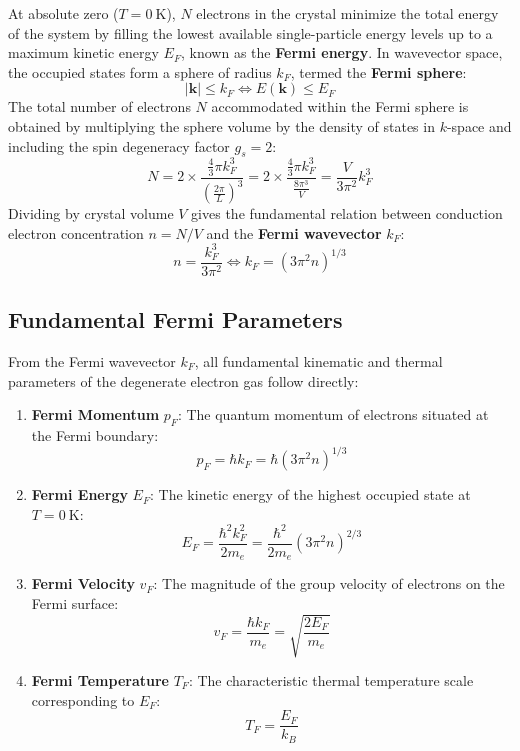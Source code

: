 \documentclass[11pt,a4paper]{article}
\newcommand{\vb}[1]{\mathbf{#1}}
\begin{document}
At absolute zero ($T = 0\ \mathrm{K}$), $N$ electrons in the crystal minimize the total energy of the system by filling the lowest available single-particle energy levels up to a maximum kinetic energy $E_F$, known as the \textbf{Fermi energy}. In wavevector space, the occupied states form a sphere of radius $k_F$, termed the \textbf{Fermi sphere}:
\begin{equation}
|\vb{k}| \le k_F \iff E(\vb{k}) \le E_F
\end{equation}
The total number of electrons $N$ accommodated within the Fermi sphere is obtained by multiplying the sphere volume by the density of states in $k$-space and including the spin degeneracy factor $g_s = 2$:
\begin{equation}
N = 2 \times \frac{\frac{4}{3}\pi k_F^3}{\left(\frac{2\pi}{L}\right)^3} = 2 \times \frac{\frac{4}{3}\pi k_F^3}{\frac{8\pi^3}{V}} = \frac{V}{3\pi^2}k_F^3
\label{eq:total_n_kF}
\end{equation}
Dividing by crystal volume $V$ gives the fundamental relation between conduction electron concentration $n = N/V$ and the \textbf{Fermi wavevector} $k_F$:
\begin{equation}
n = \frac{k_F^3}{3\pi^2} \iff \boxed{k_F = (3\pi^2 n)^{1/3}}
\label{eq:fermi_wavevector}
\end{equation}

\subsection{Fundamental Fermi Parameters}
From the Fermi wavevector $k_F$, all fundamental kinematic and thermal parameters of the degenerate electron gas follow directly:
\begin{enumerate}[leftmargin=*]
    \item \textbf{Fermi Momentum} $p_F$: The quantum momentum of electrons situated at the Fermi boundary:
    \begin{equation}
    \boxed{p_F = \hbar k_F = \hbar(3\pi^2 n)^{1/3}}
    \end{equation}
    \item \textbf{Fermi Energy} $E_F$: The kinetic energy of the highest occupied state at $T = 0\ \mathrm{K}$:
    \begin{equation}
    \boxed{E_F = \frac{\hbar^2 k_F^2}{2m_e} = \frac{\hbar^2}{2m_e}(3\pi^2 n)^{2/3}}
    \label{eq:fermi_energy}
    \end{equation}
    \item \textbf{Fermi Velocity} $v_F$: The magnitude of the group velocity of electrons on the Fermi surface:
    \begin{equation}
    \boxed{v_F = \frac{\hbar k_F}{m_e} = \sqrt{\frac{2E_F}{m_e}}}
    \label{eq:fermi_velocity}
    \end{equation}
    \item \textbf{Fermi Temperature} $T_F$: The characteristic thermal temperature scale corresponding to $E_F$:
    \begin{equation}
    \boxed{T_F = \frac{E_F}{k_B}}
    \label{eq:fermi_temperature}
    \end{equation}
\end{enumerate}
\end{document}
